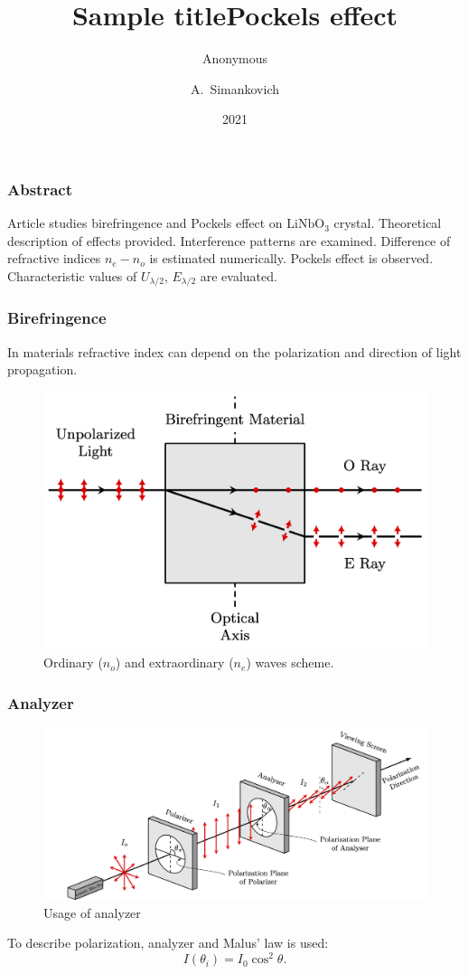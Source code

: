 \documentclass{beamer}
\title{Sample title}
\author{Anonymous}
\institute{Overleaf}
\date{2021}
\title[About Beamer] %
{Pockels effect}
\author[Arthur, Doe] %
{A.~Simankovich }
\institute[VFU] %
{
	Moscow Institute of Physics and Technology
}
\date[VLC 2023] %
\begin{document}
	
	\frame{\titlepage}
	
	\begin{frame}
		\frametitle{Abstract}
		
		Article studies birefringence and Pockels effect on $\text{LiNbO}_3$ crystal. Theoretical description of effects provided. Interference patterns are examined. Difference of refractive indices $n_e - n_o$ is estimated numerically. Pockels effect is observed. Characteristic values of $U_{\lambda/2}$, $E_{\lambda/2}$ are evaluated.
	\end{frame}
	
	\begin{frame}
		\frametitle{Birefringence}
		\footnotesize
		In materials refractive index can depend on the polarization and direction of light propagation.
		\begin{figure}
			\footnotesize
			\centering
			\includegraphics[width=0.8\linewidth]{res/birefringence}
			\vspace{-5pt}
			\footnotesize
			\caption{\footnotesize Ordinary ($n_o$) and extraordinary ($n_e$) waves scheme.}
		\end{figure}		
	\end{frame}
	
	\begin{frame}
		\frametitle{Analyzer}

		\begin{figure}
			\centering
			\includegraphics[width=1\linewidth]{res/polarizer_analyzer}
			\caption{Usage of analyzer}
		\end{figure}

		To describe polarization, analyzer and Malus' law is used:
		$$
		I(\theta_i) = I_0 \cos^2{\theta}.
		\label{eq:malus}
		$$
	\end{frame}
\end{document}

